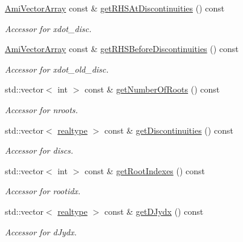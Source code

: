 \begin{DoxyCompactItemize}
\mbox{\hyperlink{classamici_1_1_ami_vector_array}{Ami\+Vector\+Array}} const  \& \mbox{\hyperlink{classamici_1_1_forward_problem_aaf71ce300e66a3034148c77417294897}{get\+R\+H\+S\+At\+Discontinuities}} () const
\begin{DoxyCompactList}\small\item\em Accessor for xdot\+\_\+disc. \end{DoxyCompactList}\item 
\mbox{\hyperlink{classamici_1_1_ami_vector_array}{Ami\+Vector\+Array}} const  \& \mbox{\hyperlink{classamici_1_1_forward_problem_a082b9f4f0d51fc8e2bf46f9f8e700d06}{get\+R\+H\+S\+Before\+Discontinuities}} () const
\begin{DoxyCompactList}\small\item\em Accessor for xdot\+\_\+old\+\_\+disc. \end{DoxyCompactList}\item 
std\+::vector$<$ int $>$ const  \& \mbox{\hyperlink{classamici_1_1_forward_problem_ac5b41527ea8caadc2484221795a9e94f}{get\+Number\+Of\+Roots}} () const
\begin{DoxyCompactList}\small\item\em Accessor for nroots. \end{DoxyCompactList}\item 
std\+::vector$<$ \mbox{\hyperlink{namespaceamici_a1bdce28051d6a53868f7ccbf5f2c14a3}{realtype}} $>$ const  \& \mbox{\hyperlink{classamici_1_1_forward_problem_abe84b94f1305622d5b143081992d495b}{get\+Discontinuities}} () const
\begin{DoxyCompactList}\small\item\em Accessor for discs. \end{DoxyCompactList}\item 
std\+::vector$<$ int $>$ const  \& \mbox{\hyperlink{classamici_1_1_forward_problem_a81f0a7c547a343c3bcd179ba5439beb3}{get\+Root\+Indexes}} () const
\begin{DoxyCompactList}\small\item\em Accessor for rootidx. \end{DoxyCompactList}\item 
std\+::vector$<$ \mbox{\hyperlink{namespaceamici_a1bdce28051d6a53868f7ccbf5f2c14a3}{realtype}} $>$ const  \& \mbox{\hyperlink{classamici_1_1_forward_problem_afb4ec4e3a67624dddea0cd64fca29ae9}{get\+D\+Jydx}} () const
\begin{DoxyCompactList}\small\item\em Accessor for d\+Jydx. \end{DoxyCompactList}\item 

\end{DoxyCompactItemize}
